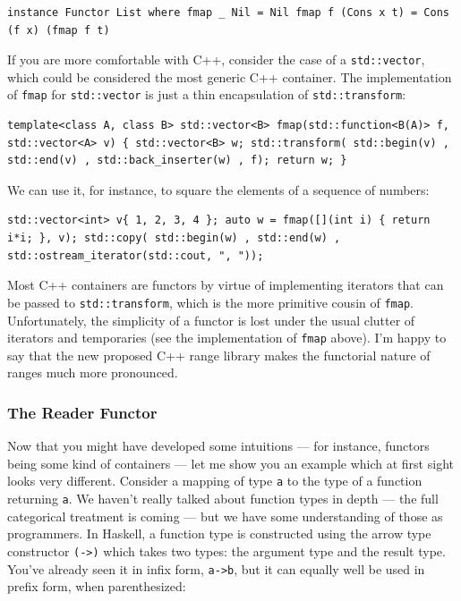 \begin{verbatim}
instance Functor List where fmap _ Nil = Nil fmap f (Cons x t) = Cons (f x) (fmap f t)
\end{verbatim}

If you are more comfortable with C++, consider the case of a
\texttt{std::vector}, which could be considered the most generic C++
container. The implementation of \texttt{fmap} for \texttt{std::vector}
is just a thin encapsulation of \texttt{std::transform}:

\begin{verbatim}
template<class A, class B> std::vector<B> fmap(std::function<B(A)> f, std::vector<A> v) { std::vector<B> w; std::transform( std::begin(v) , std::end(v) , std::back_inserter(w) , f); return w; }
\end{verbatim}

We can use it, for instance, to square the elements of a sequence of
numbers:

\begin{verbatim}
std::vector<int> v{ 1, 2, 3, 4 }; auto w = fmap([](int i) { return i*i; }, v); std::copy( std::begin(w) , std::end(w) , std::ostream_iterator(std::cout, ", "));
\end{verbatim}

Most C++ containers are functors by virtue of implementing iterators
that can be passed to \texttt{std::transform}, which is the more
primitive cousin of \texttt{fmap}. Unfortunately, the simplicity of a
functor is lost under the usual clutter of iterators and temporaries
(see the implementation of \texttt{fmap} above). I'm happy to say that
the new proposed C++ range library makes the functorial nature of ranges
much more pronounced.

\subsubsection{The Reader Functor}\label{the-reader-functor}

Now that you might have developed some intuitions --- for instance,
functors being some kind of containers --- let me show you an example
which at first sight looks very different. Consider a mapping of type
\texttt{a} to the type of a function returning \texttt{a}. We haven't
really talked about function types in depth --- the full categorical
treatment is coming --- but we have some understanding of those as
programmers. In Haskell, a function type is constructed using the arrow
type constructor \texttt{(-\textgreater{})} which takes two types: the
argument type and the result type. You've already seen it in infix form,
\texttt{a-\textgreater{}b}, but it can equally well be used in prefix
form, when parenthesized:

